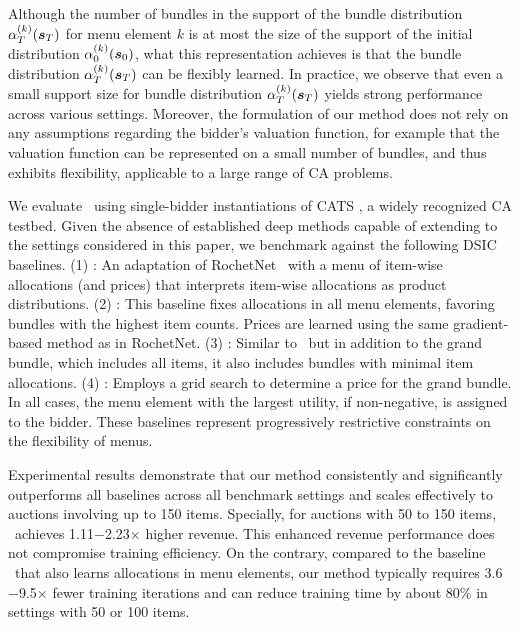 Although the number of bundles in the support of the bundle distribution $\alpha^{(k)}_T({\bm{s}}_T)$ for menu element $k$ is 
at most the size of the support of the initial distribution $\alpha^{(k)}_0({\bm{s}}_0)$, what this representation achieves
is that the bundle distribution $\alpha^{(k)}_T({\bm{s}}_T)$ can be flexibly learned.
In practice, we observe that even a small support size for bundle distribution $\alpha^{(k)}_T({\bm{s}}_T)$ yields strong performance across various settings. Moreover, the formulation of our method does not rely on any  assumptions regarding the bidder's valuation function, for example that the valuation function can be represented on a small number 
of bundles, and thus exhibits flexibility, applicable to a large range of CA problems.
%
%

We evaluate \name~using single-bidder instantiations of CATS \citep{leyton2000towards}, a widely recognized CA testbed. Given the absence of established deep methods capable of extending to the settings considered in this paper, we benchmark against the following DSIC baselines. (1) \bundle: An adaptation of RochetNet~\cite{dutting2024optimal} with a menu of item-wise allocations (and prices) that interprets item-wise allocations as product distributions. (2) \bigbundle: This baseline fixes allocations in all menu elements, favoring bundles with the highest item counts. Prices are learned using the same gradient-based method as in RochetNet. (3) \smallbundle: Similar to \bigbundle\ but in addition to the grand bundle, which includes all items, it also includes bundles with minimal item allocations. (4) \grandbundle: Employs a grid search to determine a price for the grand bundle. In all cases, the menu element with the largest utility, if non-negative, is assigned to the bidder. 
These baselines represent progressively restrictive constraints on the flexibility of menus.


Experimental results demonstrate that our method consistently and significantly outperforms all baselines across all benchmark settings and scales effectively to auctions involving up to 150 items. Specially, for auctions with 50 to 150 items, \name~achieves 1.11$-$2.23$\times$ higher revenue. This enhanced revenue performance does not compromise training efficiency. On the contrary, compared to the baseline \bundle~that also learns allocations in menu elements, our method typically requires 3.6$-$9.5$\times$ fewer training iterations and can reduce training time by about 80\% in settings with 50 or 100 items.

